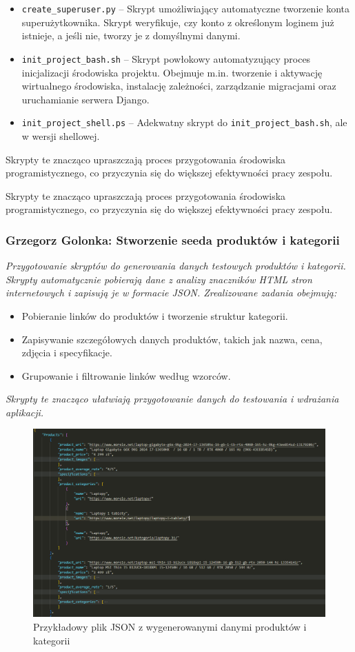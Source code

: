 \documentclass[12pt,a4paper,oneside]{article}
\theoremstyle{definition}
\numberwithin{equation}{section}
\begin{document}
\begin{itemize}
    \item \texttt{create\_superuser.py} – Skrypt umożliwiający automatyczne tworzenie konta superużytkownika. Skrypt weryfikuje, czy konto z określonym loginem już istnieje, a jeśli nie, tworzy je z domyślnymi danymi.
    \item \texttt{init\_project\_bash.sh} – Skrypt powłokowy automatyzujący proces inicjalizacji środowiska projektu. Obejmuje m.in. tworzenie i aktywację wirtualnego środowiska, instalację zależności, zarządzanie migracjami oraz uruchamianie serwera Django.
    \item \texttt{init\_project\_shell.ps} – Adekwatny skrypt do \texttt{init\_project\_bash.sh}, ale w wersji shellowej.
\end{itemize}

Skrypty te znacząco upraszczają proces przygotowania środowiska programistycznego, co przyczynia się do większej efektywności pracy zespołu.


Skrypty te znacząco upraszczają proces przygotowania środowiska programistycznego, co przyczynia się do większej efektywności pracy zespołu.
%
%
\subsubsection{Grzegorz Golonka: Stworzenie seeda produktów i kategorii}
\label{section:1.3.22}
\textit{
Przygotowanie skryptów do generowania danych testowych produktów i kategorii. Skrypty automatycznie pobierają dane z analizy znaczników HTML stron internetowych i zapisują je w formacie JSON. Zrealizowane zadania obejmują:
}
\begin{itemize}
    \item Pobieranie linków do produktów i tworzenie struktur kategorii.
    \item Zapisywanie szczegółowych danych produktów, takich jak nazwa, cena, zdjęcia i specyfikacje.
    \item Grupowanie i filtrowanie linków według wzorców.
\end{itemize}

\textit{
Skrypty te znacząco ułatwiają przygotowanie danych do testowania i wdrażania aplikacji.
}

\begin{figure}[H]
    \centering
    \includegraphics[width=0.9\columnwidth]{images/krzysztofBImages/products_seed.png}
    \caption{Przykładowy plik JSON z wygenerowanymi danymi produktów i kategorii}
\end{figure}
%
%
\end{document}

